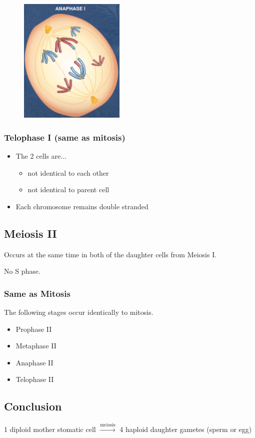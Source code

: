 \documentclass[a4paper,12pt]{article}
\begin{document}
\begin{figure}[H]
    \centering
    \includegraphics[width=0.45\textwidth]{anaphase-i}
\end{figure}

\subsubsection{Telophase I (same as mitosis)}
\begin{itemize}
    \item{
            The 2 cells are...
            \begin{itemize}
                \item{not identical to each other}
                \item{not identical to parent cell}
            \end{itemize}
        }
    \item{Each chromosome remains double stranded}
\end{itemize}

\subsection{Meiosis II}\noindent

Occurs at the same time in both of the daughter cells from Meiosis I.

No S phase.

\subsubsection{Same as Mitosis}
The following stages occur identically to mitosis.

\begin{itemize}
    \item{Prophase II}
    \item{Metaphase II}
    \item{Anaphase II}
    \item{Telophase II}
\end{itemize}

\subsection{Conclusion}
1 diploid mother stomatic cell $\xrightarrow{\textrm{meiosis}}$ 4 haploid daughter gametes (sperm or egg)
\end{document}
